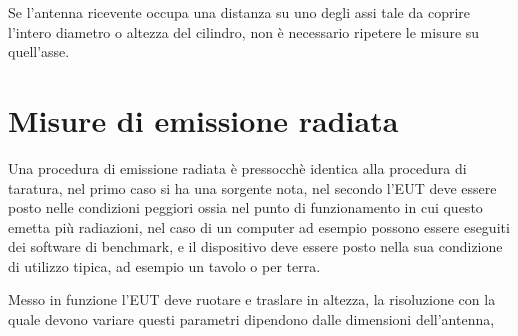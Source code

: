 Se l'antenna ricevente occupa una distanza su uno degli assi tale da coprire l'intero diametro o altezza
del cilindro, non è necessario ripetere le misure su quell'asse.

\newpage

\section{Misure di emissione radiata}
Una procedura di emissione radiata è pressocchè identica alla procedura di taratura,
nel primo caso si ha una sorgente nota, nel secondo l'EUT deve essere posto nelle condizioni peggiori
ossia nel punto di funzionamento in cui questo emetta più radiazioni, nel caso di un computer
ad esempio possono essere eseguiti dei software di benchmark, e il dispositivo deve essere posto nella sua
condizione di utilizzo tipica, ad esempio un tavolo o per terra.

Messo in funzione l'EUT deve ruotare e traslare in altezza, la risoluzione con la quale devono variare
questi parametri dipendono dalle dimensioni dell'antenna, %



